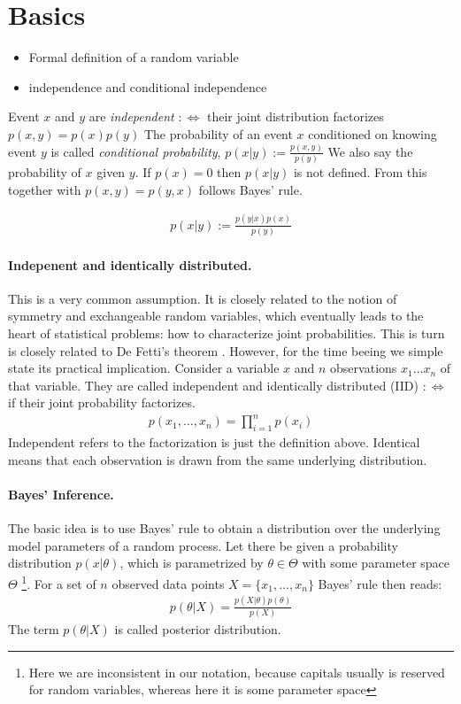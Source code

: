 \section{Basics}
\begin{itemize}
\item Formal definition of a random variable
\item independence and conditional independence
\end{itemize}
Event $x$ and $y$ are  \textit{independent }$:\Leftrightarrow$ their joint distribution  factorizes $p(x,y)=p(x)p(y)$
The probability of an event $x$ conditioned on knowing event $y$  is called \textit{conditional probability}, $p(x|y) :=  \frac{p(x,y)}{p(y)}$
We also say the probability of $x$ given $y$. If $p(x)=0$ then $p(x|y)$ is not defined.
From this together with $p(x,y) = p(y,x)$ follows Bayes' rule.
\begin{theorem}
\begin{align}
p(x|y) :=  \frac{p(y|x) p (x)}{p(y)}
\end{align}
\end{theorem} 
\paragraph{Indepenent and identically distributed.} This is a very common assumption. It is closely related to the notion of symmetry and exchangeable random variables, which eventually leads to the heart of statistical problems: how to characterize joint probabilities. This is turn is closely related to De Fetti's theorem \cite{barber}. However, for the time beeing we simple state its practical implication. Consider a variable $x$ and $n$ observations $x_1 \dots x_n$ of that variable. They are called  independent and identically distributed (IID) $:\Leftrightarrow$ if their joint probability factorizes.
\begin{align}
p(x_1, \dots, x_n) = \prod _ {i = 1} ^ n p(x_i)
\end{align}
Independent refers to the factorization is just the definition above. Identical means that each observation is drawn from the same underlying distribution.  

\paragraph*{Bayes' Inference.} The basic idea is to use Bayes' rule to obtain a distribution over the underlying model parameters of a random process. Let there be given a probability distribution $p(x|\theta)$, which is parametrized by $\theta \in \Theta$ with some parameter space $\Theta$ \footnote{Here we are inconsistent in our notation, because capitals usually is reserved for random variables, whereas here it is some parameter space}. For a set of $n$ observed data points $X=\{x_1,\dots, x_n\}$ Bayes' rule then reads:
\begin{align} \label{bayes_inference}
p(\theta|X) = \frac{p(X|\theta)p(\theta)}{p(X)}
\end{align}
The term $p(\theta|X)$ is called posterior distribution.

